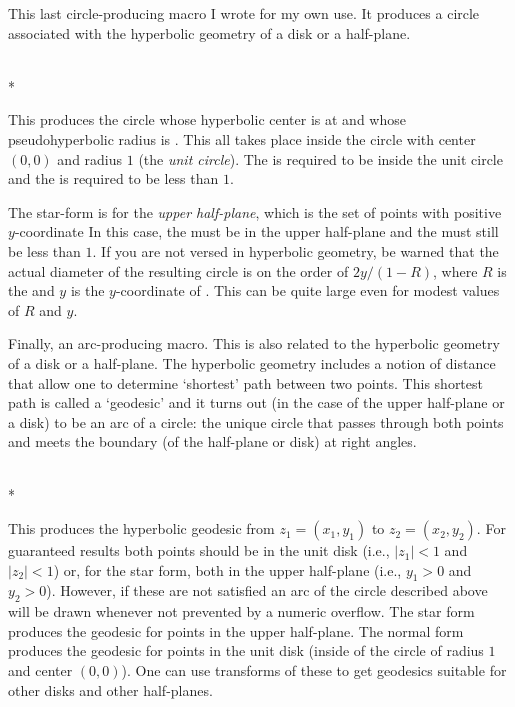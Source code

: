 \documentclass[letterpaper]{article}
\begin{document}
This last circle-producing macro I wrote for my own use. It produces a
circle associated with the hyperbolic geometry of a disk or a
half-plane.

\begin{cd}
\\
*%
%
\end{cd}

This produces the circle whose hyperbolic center is at  and
whose pseudohyperbolic radius is . This all takes place
inside the circle with center $(0,0)$ and radius $1$ (the \emph{unit
circle}). The  is required to be inside the unit circle and
the  is required to be less than $1$.

The star-form is for the \emph{upper half-plane}, which is the set of
points with positive $y$-coordinate In this case, the  must
be in the upper half-plane and the  must still be less than
$1$. If you are not versed in hyperbolic geometry, be warned that the
actual diameter of the resulting circle is on the order of $2y/(1-R)$,
where $R$ is the  and $y$ is the $y$-coordinate of
. This can be quite large even for modest values of $R$ and
$y$.

Finally, an arc-producing macro. This is also related to the hyperbolic
geometry of a disk or a half-plane. The hyperbolic geometry includes a
notion of distance that allow one to determine `shortest' path between
two points. This shortest path is called a `geodesic' and it turns out
(in the case of the upper half-plane or a disk) to be an arc of a
circle: the unique circle that passes through both points and meets the
boundary (of the half-plane or disk) at right angles.

\begin{cd}
\\
*%
%
\end{cd}

This produces the hyperbolic geodesic from $z_1=(x_1,y_1)$ to
$z_2=(x_2,y_2)$. For guaranteed results both points should be in the
unit disk (i.e., $|z_1| < 1$ and $|z_2| < 1$) or, for the star form,
both in the upper half-plane (i.e., $y_1 > 0$ and $y_2 > 0$). However,
if these are not satisfied an arc of the circle described above will be
drawn whenever not prevented by a numeric overflow. The star form
produces the geodesic for points in the upper half-plane. The normal
form produces the geodesic for points in the unit disk (inside of the
circle of radius $1$ and center $(0,0)$). One can use transforms of
these to get geodesics suitable for other disks and other half-planes.
\end{document}
